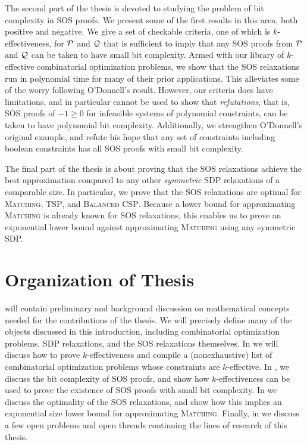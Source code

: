 The second part of the thesis is devoted to studying the problem of bit complexity in SOS proofs. We present some of the first results in this area, both positive and negative. We give a set of checkable criteria, one of which is $k$-effectiveness, for $\mathcal P$ and $\mathcal Q$ that is sufficient to imply that any SOS proofs from $\mathcal P$ and $\mathcal Q$ can be taken to have small bit complexity. Armed with our library of $k$-effective combinatorial optimization problems, we show that the SOS relaxations run in polynomial time for many of their prior applications. This alleviates some of the worry following O'Donnell's result. However, our criteria does have limitations, and in particular cannot be used to show that \emph{refutations}, that is, SOS proofs of $-1 \geq 0$ for infeasible systems of polynomial constraints, can be taken to have polynomial bit complexity.
Additionally, we strengthen O'Donnell's original example, and refute his hope that any set of constraints including boolean constraints has all SOS proofs with small bit complexity. 

The final part of the thesis is about proving that the SOS relaxations achieve the best approximation compared to any other \emph{symmetric} SDP relaxations of a comparable size. In particular, we prove that the SOS relaxations are optimal for \textsc{Matching}, \textsc{TSP}, and \textsc{Balanced CSP}. Because a lower bound for approximating \textsc{Matching} is already known for SOS relaxations, this enables us to prove an exponential lower bound against approximating \textsc{Matching} using any symmetric SDP. 

\section{Organization of Thesis}

 will contain preliminary and background discussion on mathematical concepts needed for the contributions of the thesis. We will precisely define many of the objects discussed in this introduction, including combinatorial optimization problems, SDP relaxations, and the SOS relaxations themselves. In  we will discuss how to prove $k$-effectiveness and compile a (nonexhaustive) list of combinatorial optimization problems whose constraints are $k$-effective. In , we discuss the bit complexity of SOS proofs, and show how $k$-effectiveness can be used to prove the existence of SOS proofs with small bit complexity. In  we discuss the optimality of the SOS relaxations, and show how this implies an exponential size lower bound for approximating \textsc{Matching}. Finally, in  we discuss a few open problems and open threads continuing the lines of research of this thesis.